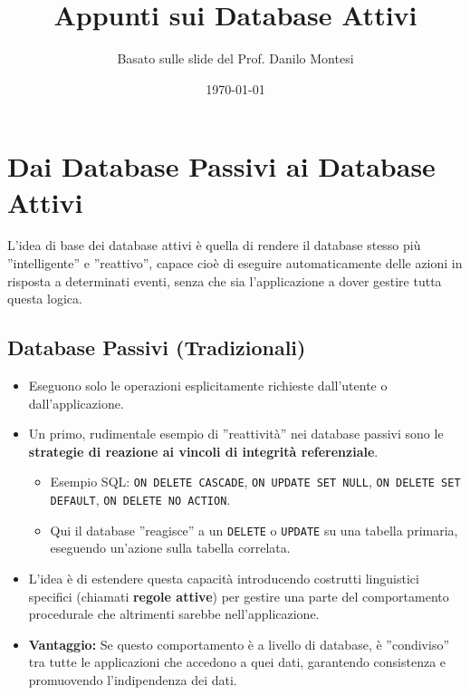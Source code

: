 

\usepackage{hyperref}

\title{Appunti sui Database Attivi}
\author{Basato sulle slide del Prof. Danilo Montesi}
\date{\today}


	
	\maketitle
	\tableofcontents
	\newpage
	
	\section{Dai Database Passivi ai Database Attivi}
	L'idea di base dei database attivi è quella di rendere il database stesso più ''intelligente'' e ''reattivo'', capace cioè di eseguire automaticamente delle azioni in risposta a determinati eventi, senza che sia l'applicazione a dover gestire tutta questa logica.
	
	\subsection{Database Passivi (Tradizionali)}
	\begin{itemize}
		\item Eseguono solo le operazioni esplicitamente richieste dall'utente o dall'applicazione.
		\item Un primo, rudimentale esempio di ''reattività'' nei database passivi sono le \textbf{strategie di reazione ai vincoli di integrità referenziale}.
		\begin{itemize}
			\item Esempio SQL: \texttt{ON DELETE CASCADE}, \texttt{ON UPDATE SET NULL}, \texttt{ON DELETE SET DEFAULT}, \texttt{ON DELETE NO ACTION}.
			\item Qui il database ''reagisce'' a un \texttt{DELETE} o \texttt{UPDATE} su una tabella primaria, eseguendo un'azione sulla tabella correlata.
		\end{itemize}
		\item L'idea è di estendere questa capacità introducendo costrutti linguistici specifici (chiamati \textbf{regole attive}) per gestire una parte del comportamento procedurale che altrimenti sarebbe nell'applicazione.
		\item \textbf{Vantaggio:} Se questo comportamento è a livello di database, è ''condiviso'' tra tutte le applicazioni che accedono a quei dati, garantendo consistenza e promuovendo l'indipendenza dei dati.
	\end{itemize}
	
